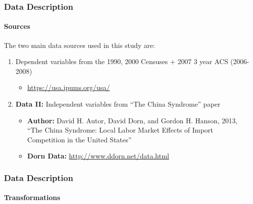 \begin{frame}
    \frametitle{Data Description}
    \framesubtitle{Sources}
    The two main data sources used in this study are:
    \begin{enumerate}
        \item Dependent variables from the 1990, 2000 Censuses + 2007 3 year ACS (2006-2008)
        \begin{itemize}
            \item \url{https://usa.ipums.org/usa/}
        \end{itemize}
        \item \textbf{Data II:} Independent variables from “The China Syndrome” paper
        \begin{itemize}
            \item \textbf{Author:} David H. Autor, David Dorn, and Gordon H. Hanson, 2013, “The China Syndrome: Local Labor Market Effects of Import Competition in the United States”
            \item \textbf{Dorn Data:} \url{http://www.ddorn.net/data.html}
        \end{itemize}
    \end{enumerate}
\end{frame}
\begin{frame}
    \frametitle{Data Description}
    \framesubtitle{Transformations}
\end{frame}



